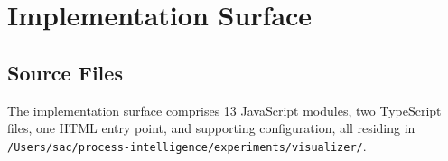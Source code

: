 
\section{Implementation Surface}
\label{sec:experiments-visualizer-impl}

\subsection{Source Files}
\label{sec:experiments-visualizer-impl-sources}

The implementation surface comprises 13 JavaScript modules, two TypeScript files, one HTML
entry point, and supporting configuration, all residing in
\texttt{/Users/sac/process-intelligence/experiments/visualizer/}.

